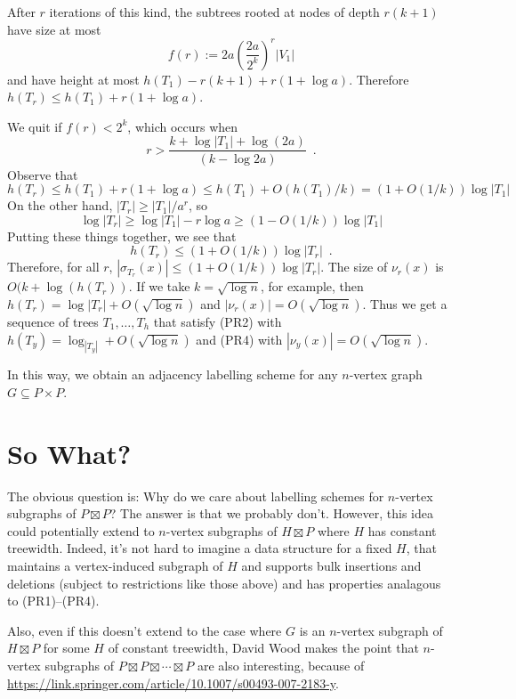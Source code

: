 \documentclass[kpfonts]{patmorin}
\begin{document}
After $r$ iterations of this kind, the subtrees rooted at nodes of depth $r(k+1)$ have size at most
\[
     f(r) := 2a\left(\frac{2a}{2^k}\right)^r|V_1|
\]
and have height at most $h(T_1)-r(k+1)+r(1+\log a)$.  Therefore $h(T_r)\le h(T_1)+r(1+\log a)$.

We quit if $f(r)<2^k$, which occurs when
\[
   r > \frac{k + \log |T_1| + \log(2a)}{(k-\log 2a)} \enspace .
\]
Observe that 
\[
   h(T_r) \le h(T_1)+r(1+\log a) \le h(T_1) + O(h(T_1)/k) = (1+O(1/k))\log|T_1|
\]
On the other hand, $|T_r|\ge |T_1|/a^r$, so
\[  \log |T_r| \ge \log|T_1| - r\log a \ge (1-O(1/k))\log|T_1| \]
Putting these things together, we see that 
\[
   h(T_r) \le (1+O(1/k))\log |T_r| \enspace .
\]
Therefore, for all $r$, $|\sigma_{T_r}(x)|\le (1+O(1/k))\log|T_r|$.  The size of $\nu_r(x)$ is $O(k+\log(h(T_r))$.  If we take $k=\sqrt{\log n}$, for example, then $h(T_r)=\log |T_r|+O(\sqrt{\log n})$ and $|\nu_r(x)|=O(\sqrt{\log n})$.  Thus we get a sequence of trees $T_1,\ldots,T_h$ that satisfy (PR2) with $h(T_y)=\log_|T_y| + O(\sqrt{\log n})$ and (PR4) with $|\nu_y(x)|=O(\sqrt{\log n})$.

In this way, we obtain an adjacency labelling scheme for any $n$-vertex graph $G\subseteq P\times P$.

\section{So What?}

The obvious question is: Why do we care about labelling schemes for $n$-vertex subgraphs of $P\boxtimes P$? The answer is that we probably don't.  However, this idea could potentially extend to $n$-vertex subgraphs of $H\boxtimes P$ where $H$ has constant treewidth.  Indeed, it's not hard to imagine a data structure for a fixed $H$, that maintains a vertex-induced subgraph of $H$ and supports bulk insertions and deletions (subject to restrictions like those above) and has properties analagous to (PR1)--(PR4).

Also, even if this doesn't extend to the case where $G$ is an $n$-vertex subgraph of $H\boxtimes P$ for some $H$ of constant treewidth, David Wood makes the point that $n$-vertex subgraphs of $P\boxtimes P\boxtimes\cdots\boxtimes P$ are also interesting, because of \url{https://link.springer.com/article/10.1007/s00493-007-2183-y}.









% 
% 
% 
% 
% 
\end{document}
